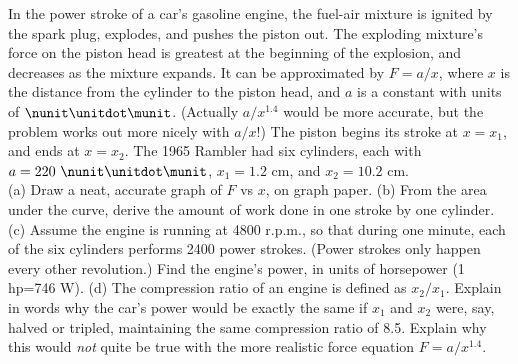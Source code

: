 In the power stroke of a car's gasoline engine, the
fuel-air mixture is ignited by the spark plug, explodes, and
pushes the piston out. The exploding mixture's force on the
piston head is greatest at the beginning of the explosion,
and decreases as the mixture expands. It can be approximated
by $F=a/x$, where $x$ is the distance from the cylinder to
the piston head, and $a$ is a constant with units of $\nunit\unitdot\munit$.
(Actually $a/x^{1.4}$ would be more accurate, but the problem
works out more nicely with $a/x$!) The piston begins its
stroke at $x=x_1$, and ends at $x=x_2$. The 1965 Rambler had
six cylinders, each with $a=220\ \nunit\unitdot\munit$, $x_1=1.2$ cm, and $x_2=10.2$ cm.\\
(a) Draw a neat, accurate graph of $F$ vs $x$, on graph paper.\hwendpart
(b) From the area under the curve, derive the amount of 
work done in one stroke by one cylinder.\answercheck\hwendpart
(c) Assume the engine is running at 4800 r.p.m., so that \answercheck
during one minute, each of the six cylinders performs 2400
power strokes. (Power strokes only happen every other
revolution.) Find the engine's power, in units of horsepower (1 hp=746 W).\hwendpart
(d) The compression ratio of an engine is defined as
$x_2/x_1$. Explain in words why the car's power would be
exactly the same if $x_1$ and $x_2$ were, say, halved or
tripled, maintaining the same compression ratio of 8.5.
Explain why this would \emph{not} quite be true with the
more realistic force equation $F=a/x^{1.4}$.
